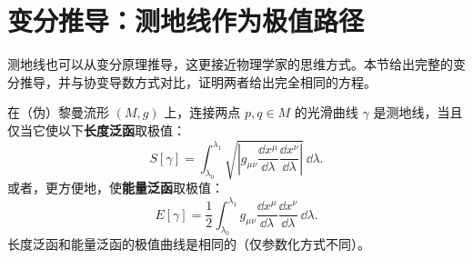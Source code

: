 \section{变分推导：测地线作为极值路径}
\label{sec:variational}

测地线也可以从变分原理推导，这更接近物理学家的思维方式。本节给出完整的变分推导，并与协变导数方式对比，证明两者给出完全相同的方程。

\begin{theorem}[测地线的变分原理]
在（伪）黎曼流形 $(M, g)$ 上，连接两点 $p, q \in M$ 的光滑曲线 $\gamma$ 是测地线，当且仅当它使以下\textbf{长度泛函}取极值：
\begin{equation}
    S[\gamma] = \int_{\lambda_0}^{\lambda_1} \sqrt{\left|g_{\mu\nu} \frac{\dd x^\mu}{\dd\lambda} \frac{\dd x^\nu}{\dd\lambda}\right|} \, \dd\lambda.
\end{equation}
或者，更方便地，使\textbf{能量泛函}取极值：
\begin{equation}
    E[\gamma] = \frac{1}{2} \int_{\lambda_0}^{\lambda_1} g_{\mu\nu} \frac{\dd x^\mu}{\dd\lambda} \frac{\dd x^\nu}{\dd\lambda} \, \dd\lambda.
\end{equation}
长度泛函和能量泛函的极值曲线是相同的（仅参数化方式不同）。
\end{theorem}

